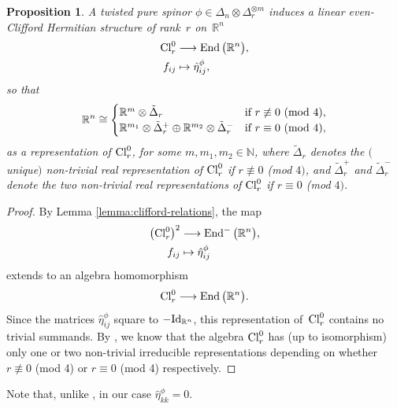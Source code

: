 \documentclass[pdftex]{sigma}
\newcommand{\lra}{\longrightarrow}
\numberwithin{equation}{section}
\newtheorem{Proposition}[Theorem]{Proposition}
 { \theoremstyle{definition}
\newtheorem{Definition}[Theorem]{Definition}
\newtheorem{Remark}[Theorem]{Remark}
\newtheorem{Example}[Theorem]{Example}
}
\begin{document}
\begin{Proposition}\label{prop: Clifford transfer} A twisted pure spinor $\phi\in\Delta_n\otimes\Delta_r^{\otimes m}$ induces a linear even-Clifford Hermitian structure
of rank~$r$ on~$\mathbb{R}^n$
\begin{align*}
{\rm Cl}_r^0&\lra \operatorname{End}\big(\mathbb{R}^n\big), \\
f_{ij}&\mapsto \hat\eta_{ij}^\phi,
 \end{align*}
so that
\begin{gather*}\mathbb{R}^n \cong
\begin{cases}
\mathbb{R}^m\otimes \tilde\Delta_r & \text{if $r\not\equiv 0$ {\rm (mod 4)}},\\
\mathbb{R}^{m_1}\otimes\tilde\Delta_r^+ \oplus \mathbb{R}^{m_2}\otimes\tilde\Delta_r^- &
\text{if $r\equiv 0$ {\rm (mod 4)}},\end{cases}
\end{gather*}
as a representation of ${\rm Cl}_r^0$, for some $m, m_1, m_2\in\mathbb{N}$, where $\tilde\Delta_r$ denotes the $($unique$)$ non-trivial real representation of ${\rm Cl}_r^0$ if $r\not\equiv 0$ {\rm (mod} $4)$, and $\tilde\Delta_r^+$ and $\tilde\Delta_r^-$ denote the two non-trivial real representations of ${\rm Cl}_r^0$ if $r\equiv 0$ {\rm (mod} $4)$.
\end{Proposition}
\begin{proof} By Lemma \ref{lemma:clifford-relations}, the map
\begin{align*}
\big({\rm Cl}_r^0\big)^2&\lra \operatorname{End}^-\big(\mathbb{R}^n\big),\\
f_{ij} &\mapsto \hat\eta_{ij}^\phi
\end{align*}
extends to an algebra homomorphism
\begin{gather*}
{\rm Cl}_r^0 \lra \operatorname{End}\big(\mathbb{R}^n\big).
\end{gather*}
Since the matrices $\hat\eta_{ij}^\phi$ square to $-{\rm Id}_{\mathbb{R}^n}$, this representation of~${\rm Cl}_r^0$ contains no trivial summands. By \cite[Theorem~5.6]{Lawson}, we know that the algebra ${\rm Cl}_r^0$ has (up to isomorphism) only one or two non-trivial irreducible representations depending on whether $r\not\equiv 0$ ({\rm mod} 4) or $r\equiv 0$ ({\rm mod} 4) respectively.
\end{proof}

\begin{Remark} Note that, unlike \cite{Moroianu-Semmelmann}, in our case $\hat\eta_{kk}^\phi=0$.\end{Remark}
\end{document}
